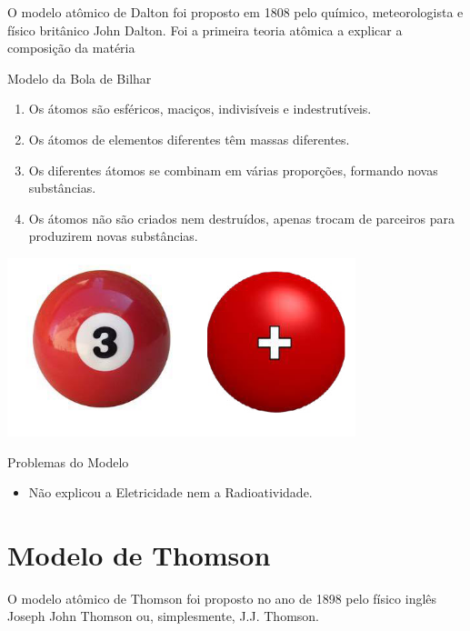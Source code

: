\documentclass[10pt]{scrartcl}
\begin{document}
O modelo atômico de Dalton foi proposto em 1808 pelo químico, meteorologista e físico britânico John Dalton. Foi a primeira teoria atômica a explicar a composição da matéria

\begin{Box2}{Modelo da Bola de Bilhar}
\begin{enumerate}
\item Os átomos são esféricos, maciços, indivisíveis e indestrutíveis.
\item Os átomos de elementos diferentes têm massas diferentes.
\item Os diferentes átomos se combinam em várias proporções, formando novas substâncias.
\item Os  átomos  não  são  criados  nem  destruídos,  apenas trocam de parceiros para produzirem novas substâncias.
\end{enumerate}

\begin{center}
\includegraphics[width=.2\linewidth]{Quimica-Geral-Aula/bola-bilhar.png}
\end{center}


\end{Box2}

\begin{Box2}{Problemas do Modelo}
\begin{itemize}
\item Não explicou a Eletricidade nem a Radioatividade.
\end{itemize}
\end{Box2}

\section{Modelo de Thomson}
\label{sec:org16a26da}

O modelo atômico de Thomson foi proposto no ano de 1898 pelo físico inglês Joseph John Thomson ou, simplesmente, J.J. Thomson.
\end{document}
